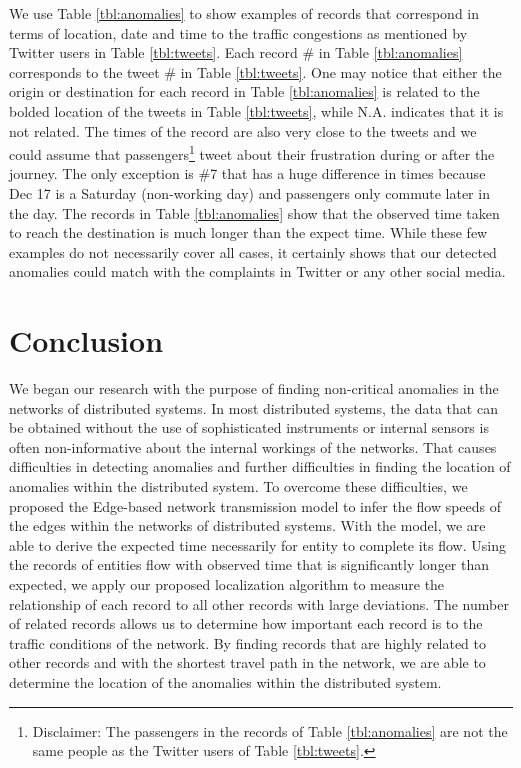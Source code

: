 \documentclass[conference]{IEEEtran.1.8}
\begin{document}
We use Table \ref{tbl:anomalies} to show examples of records that correspond in terms of location, date and time to the traffic congestions as mentioned by Twitter users in Table \ref{tbl:tweets}. Each record \# in Table \ref{tbl:anomalies} corresponds to the tweet \# in Table \ref{tbl:tweets}. One may notice that either the origin or destination for each record in Table \ref{tbl:anomalies} is related to the bolded location of the tweets in Table \ref{tbl:tweets}, while N.A. indicates that it is not related. The times of the record are also very close to the tweets and we could assume that passengers\footnote{Disclaimer: The passengers in the records of Table \ref{tbl:anomalies} are not the same people as the Twitter users of Table \ref{tbl:tweets}.} tweet about their frustration during or after the journey. The only exception is \#7 that has a huge difference in times because Dec 17 is a Saturday (non-working day) and passengers only commute later in the day. The records in Table \ref{tbl:anomalies} show that the observed time taken to reach the destination is much longer than the expect time. While these few examples do not necessarily cover all cases, it certainly shows that our detected anomalies could match with the complaints in Twitter or any other social media.

\section{Conclusion}
\label{sec:conclusion}

We began our research with the purpose of finding non-critical anomalies in the networks of distributed systems. In most distributed systems, the data that can be obtained without the use of sophisticated instruments or internal sensors is often non-informative about the internal workings of the networks. That causes difficulties in detecting anomalies and further difficulties in finding the location of anomalies within the distributed system. To overcome these difficulties, we proposed the Edge-based network transmission model to infer the flow speeds of the edges within the networks of distributed systems. With the model, we are able to derive the expected time necessarily for entity to complete its flow. Using the records of entities flow with observed time that is significantly longer than expected, we apply our proposed localization algorithm to measure the relationship of each record to all other records with large deviations. The number of related records allows us to determine how important each record is to the traffic conditions of the network. By finding records that are highly related to other records and with the shortest travel path in the network, we are able to determine the location of the anomalies within the distributed system.
\end{document}
